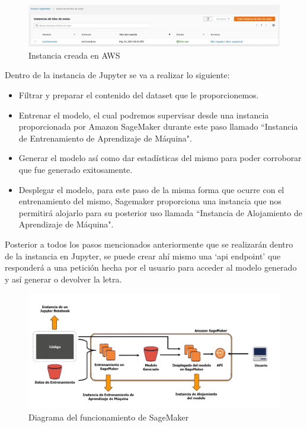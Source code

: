 \documentclass[12pt, a4paper, titlepage]{report}
\begin{document}
		\begin{figure}[H]
			\includegraphics[width=12cm]{./imagenes/Disenio/Iteracion_4/JupyterInstance.jpg}
			\centering 
			\caption{Instancia creada en AWS}
		\end{figure}
	
	Dentro de la instancia de Jupyter se va a realizar lo siguiente:
	
	\begin{itemize}
		\item Filtrar y preparar el contenido del dataset que le proporcionemos.
		\item Entrenar el modelo, el cual podremos supervisar desde una instancia proporcionada por Amazon SageMaker durante este paso llamado “Instancia de Entrenamiento de Aprendizaje de Máquina".
		\item Generar el modelo así como dar estadísticas del mismo para poder corroborar que fue generado exitosamente.
		\item Desplegar el modelo, para este paso de la misma forma que ocurre con el entrenamiento del mismo, Sagemaker proporciona una instancia que nos permitirá alojarlo para su posterior uso llamada “Instancia de Alojamiento de Aprendizaje de Máquina".
	\end{itemize}
	
	Posterior a todos los pasos mencionados anteriormente que se realizarán dentro de la instancia en Jupyter, se puede crear ahí mismo una `\acrshort{api} endpoint' que responderá a una petición hecha por el usuario para acceder al modelo generado y así generar o devolver la letra.
	
	\begin{figure}[H]
		\includegraphics[width=12cm]{./imagenes/Disenio/Iteracion_4/sagemaker_function.png}
		\centering 
		\caption{Diagrama del funcionamiento de SageMaker}
	\end{figure}
	
\end{document}
